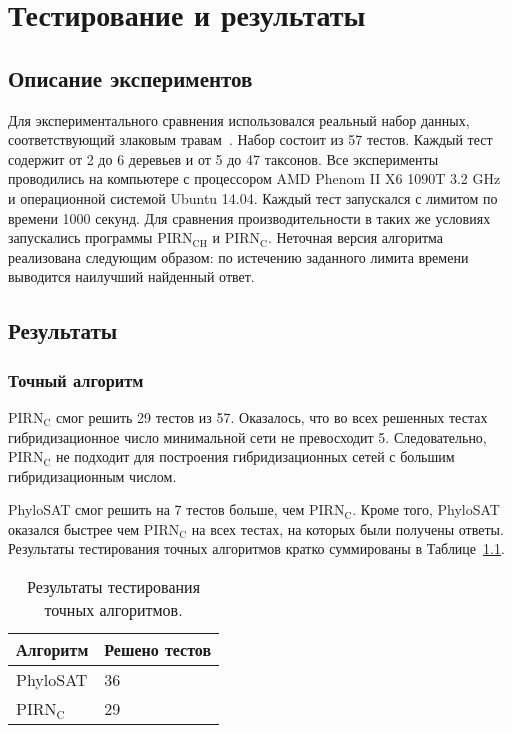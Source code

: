 \FloatBarrier
\chapter{Тестирование и результаты}

\FloatBarrier
\section{Описание экспериментов}

Для экспериментального сравнения использовался реальный набор данных, соответствующий злаковым травам~\cite{grass2001phylogeny}.
Набор состоит из 57 тестов.
Каждый тест содержит от 2 до 6 деревьев и от 5 до 47 таксонов.
Все эксперименты проводились на компьютере с процессором AMD Phenom II X6 1090T 3.2 GHz и операционной системой Ubuntu 14.04.
Каждый тест запускался с лимитом по времени 1000 секунд.
Для сравнения производительности в таких же условиях запускались программы $\mathrm{PIRN_{CH}}$ и $\mathrm{PIRN_C}$.
Неточная версия алгоритма реализована следующим образом: по истечению заданного лимита времени выводится наилучший найденный ответ.

\FloatBarrier
\section{Результаты}

\subsection{Точный алгоритм}

PIRN$\mathrm{_C}$ смог решить 29 тестов из 57.
Оказалось, что во всех решенных тестах гибридизационное число минимальной сети не превосходит 5.
Следовательно, PIRN$\mathrm{_C}$ не подходит для построения гибридизационных сетей с большим гибридизационным числом.

PhyloSAT смог решить на 7 тестов больше, чем PIRN$\mathrm{_C}$.
Кроме того, PhyloSAT оказался быстрее чем PIRN$\mathrm{_C}$ на всех тестах, на которых были получены ответы.
Результаты тестирования точных алгоритмов кратко суммированы в Таблице~\ref{exact-results-table}.

\begin{table}[t]
\caption{Результаты тестирования точных алгоритмов.}
\centering
\begin{tabular}{l | l}
	Алгоритм & Решено тестов \\
	\hline
	PhyloSAT & 36 \\
	PIRN$\mathrm{_C}$ & 29 \\
\end{tabular}
\label{exact-results-table}
\end{table}

